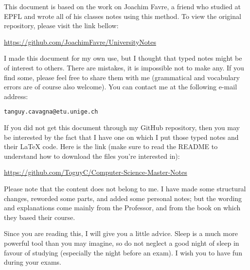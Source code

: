 This document is based on the work on Joachim Favre, a friend who studied at EPFL and wrote all of his classes notes using this method. To view the original repository, please visit the link bellow:
\begin{center}
    \url{https://github.com/JoachimFavre/UniversityNotes}
\end{center}

I made this document for my own use, but I thought that typed notes might be of interest to others. There are mistakes, it is impossible not to make any. If you find some, please feel free to share them with me (grammatical and vocabulary errors are of course also welcome). You can contact me at the following e-mail address:
\begin{center}
    \texttt{tanguy.cavagna@etu.unige.ch}
\end{center}

If you did not get this document through my GitHub repository, then you may be interested by the fact that I have one on which I put those typed notes and their \LaTeX{} code. Here is the link (make sure to read the README to understand how to download the files you're interested in):
\begin{center}
    \url{https://github.com/ToguyC/Computer-Science-Master-Notes}
\end{center}

Please note that the content does not belong to me. I have made some structural changes, reworded some parts, and added some personal notes; but the wording and explanations come mainly from the Professor, and from the book on which they based their course.

Since you are reading this, I will give you a little advice. Sleep is a much more powerful tool than you may imagine, so do not neglect a good night of sleep in favour of studying (especially the night before an exam). I wish you to have fun during your exams.
